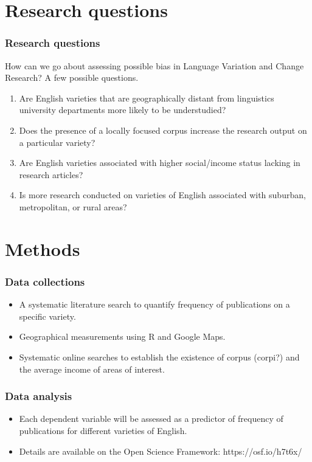 \documentclass{beamer}
\begin{document}
\section{Research questions}
\begin{frame}
\frametitle{Research questions}
How can we go about assessing possible bias in Language Variation and Change Research? A few possible questions.
\begin{enumerate} 
		\item Are English varieties that are geographically distant from linguistics university departments more likely to be understudied? \label{geog}
		
		\item Does the presence of a locally focused corpus increase the research output on a particular variety?  \label{corpus}
		
		\item Are English varieties associated with higher social/income status lacking in research articles? \label{income}
		
		\item Is more research conducted on varieties of English associated with suburban, metropolitan, or rural areas? \label{suburban}
\end{enumerate}
\end{frame}


\section{Methods}
\begin{frame}
\frametitle{Data collections}
\begin{itemize}
\item A systematic literature search to quantify frequency of publications on a specific variety.
\item Geographical measurements using R and Google Maps.
\item Systematic online searches to establish the existence of corpus (corpi?) and the average income of areas of interest.
\end{itemize}
\end{frame}

\begin{frame}
\frametitle{Data analysis}
\begin{itemize}
\item Each dependent variable will be assessed as a predictor of frequency of publications for different varieties of English.
\item Details are available on the Open Science Framework: https://osf.io/h7t6x/
\end{itemize}
\end{frame}
\end{document}
